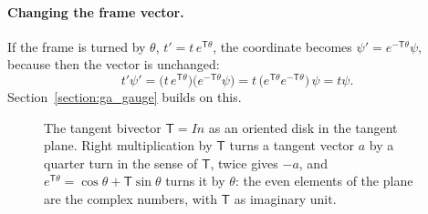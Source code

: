 \paragraph{Changing the frame vector.} If the frame is turned by $\theta$, $t' = t\, e^{\mathsf T\theta}$, the coordinate becomes $\psi' = e^{-\mathsf T\theta}\psi$, because then the vector is unchanged:
\begin{equation*}
t'\psi' = \big(t\, e^{\mathsf T\theta}\big)\big(e^{-\mathsf T\theta}\psi\big) = t\,\big(e^{\mathsf T\theta}e^{-\mathsf T\theta}\big)\,\psi = t\psi .
\end{equation*}
Section~\ref{section:ga_gauge} builds on this.
\begin{figure}[t]
\centering
{}
\caption{The tangent bivector $\mathsf T = I n$ as an oriented disk in the tangent plane. Right multiplication by $\mathsf T$ turns a tangent vector $a$ by a quarter turn in the sense of $\mathsf T$, twice gives $-a$, and $e^{\mathsf T \theta} = \cos\theta + \mathsf T \sin\theta$ turns it by $\theta$: the even elements of the plane are the complex numbers, with $\mathsf T$ as imaginary unit.}
\label{fig:quarter_turn}
\end{figure}

